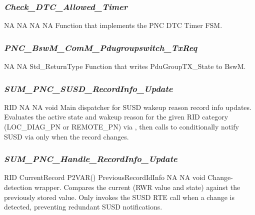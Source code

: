 \subsubsection{\textit{Check_DTC_Allowed_Timer}}

{NA}
{NA}
{NA}
{NA}
{Function that implements the PNC DTC Timer FSM.}

\subsubsection{\textit{PNC_BswM_ComM_Pdugroupswitch_TxReq}}

	{ }
	{NA}
	{NA}
	{Std_ReturnType}
	{Function that writes PduGroupTX_State to BswM.}

{  }

\subsubsection{\textit{SUM\_PNC\_SUSD\_RecordInfo\_Update}}

{ \hspace*{1.5in} \vrule \hspace*{0.1in} RID}
{NA}
{NA}
{void}
{Main dispatcher for SUSD wakeup reason record info updates. Evaluates the active state and wakeup reason for the given RID category (LOC\_DIAG\_PN or REMOTE\_PN) via , then calls  to conditionally notify SUSD via  only when the record changes.}

{ }

\subsubsection{\textit{SUM\_PNC\_Handle\_RecordInfo\_Update}}

{ \hspace*{1.5in} \vrule \hspace*{0.1in} RID \newline
  \hspace*{1.2in} \vrule \hspace*{0.1in} CurrentRecord \newline
 P2VAR() \hspace*{0.8in} \vrule \hspace*{0.1in} PreviousRecordIdInfo}
{NA}
{NA}
{void}
{Change-detection wrapper. Compares the current  (RWR value and state) against the previously stored value. Only invokes the SUSD  RTE call when a change is detected, preventing redundant SUSD notifications.}

